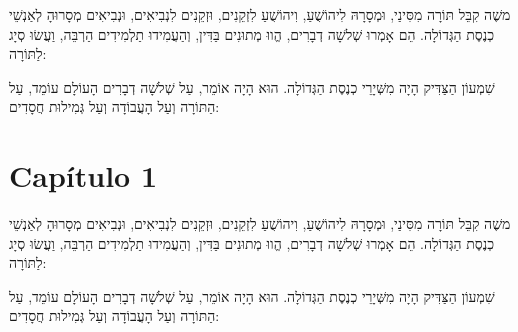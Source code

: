 \begin{pages}

\begin{Leftside}
    \beginnumbering
    \pstart
משֶׁה קִבֵּל תּוֹרָה מִסִּינַי, וּמְסָרָהּ לִיהוֹשֻׁעַ, וִיהוֹשֻׁעַ לִזְקֵנִים, וּזְקֵנִים לִנְבִיאִים, וּנְבִיאִים מְסָרוּהָ לְאַנְשֵׁי כְנֶסֶת הַגְּדוֹלָה. הֵם אָמְרוּ שְׁלשָׁה דְבָרִים, הֱווּ מְתוּנִים בַּדִּין, וְהַעֲמִידוּ תַלְמִידִים הַרְבֵּה, וַעֲשׂוּ סְיָג לַתּוֹרָה:

\pend
\pstart

שִׁמְעוֹן הַצַּדִּיק הָיָה מִשְּׁיָרֵי כְנֶסֶת הַגְּדוֹלָה. הוּא הָיָה אוֹמֵר, עַל שְׁלשָׁה דְבָרִים הָעוֹלָם עוֹמֵד, עַל הַתּוֹרָה וְעַל הָעֲבוֹדָה וְעַל גְּמִילוּת חֲסָדִים:
\pend
    \endnumbering
  \end{Leftside}

  \begin{Rightside}
    \beginnumbering
    \pstart
		\lipsum[1]
	\pend
	\pstart
		\lipsum[1]
	\pend
    \endnumbering
  \end{Rightside}

\end{pages}
  \Pages


\chapter{Capítulo 1}

משֶׁה קִבֵּל תּוֹרָה מִסִּינַי, וּמְסָרָהּ לִיהוֹשֻׁעַ, וִיהוֹשֻׁעַ לִזְקֵנִים, וּזְקֵנִים לִנְבִיאִים, וּנְבִיאִים מְסָרוּהָ לְאַנְשֵׁי כְנֶסֶת הַגְּדוֹלָה. הֵם אָמְרוּ שְׁלשָׁה דְבָרִים, הֱווּ מְתוּנִים בַּדִּין, וְהַעֲמִידוּ תַלְמִידִים הַרְבֵּה, וַעֲשׂוּ סְיָג לַתּוֹרָה:

שִׁמְעוֹן הַצַּדִּיק הָיָה מִשְּׁיָרֵי כְנֶסֶת הַגְּדוֹלָה. הוּא הָיָה אוֹמֵר, עַל שְׁלשָׁה דְבָרִים הָעוֹלָם עוֹמֵד, עַל הַתּוֹרָה וְעַל הָעֲבוֹדָה וְעַל גְּמִילוּת חֲסָדִים:

